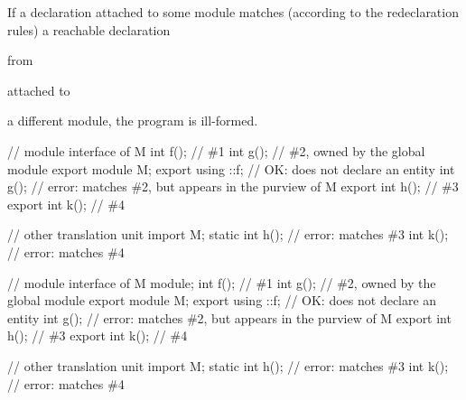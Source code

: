 \begin{std.txt}
  \alinea
  If a declaration attached to some module
  matches (according to the redeclaration rules) a reachable declaration
  \begin{before}\color{addclr}
  from
  \end{before}
  \begin{after}\color{addclr}
  attached to
  \end{after}
  a different module, 
  the program is ill-formed.
  \begin{example}
    \begin{before}\color{addclr}
    \begin{codeblock}
      // module interface of M
      int f();            // \#1
      int g();            // \#2, owned by the global module
      export module M;
      export using ::f;   // OK: does not declare an entity
      int g();            // error: matches \#2, but appears in the purview of M
      export int h();     // \#3
      export int k();     // \#4

      // other translation unit
      import M;
      static int h();     // error: matches \#3
      int k();            // error: matches \#4
    \end{codeblock}
    \end{before}\begin{after}\color{addclr}
    \begin{codeblock}
      // module interface of M
      module;
      int f();            // \#1
      int g();            // \#2, owned by the global module
      export module M;
      export using ::f;   // OK: does not declare an entity
      int g();            // error: matches \#2, but appears in the purview of M
      export int h();     // \#3
      export int k();     // \#4

      // other translation unit
      import M;
      static int h();     // error: matches \#3
      int k();            // error: matches \#4
    \end{codeblock}
    \end{after}
  \end{example}


\end{std.txt}
